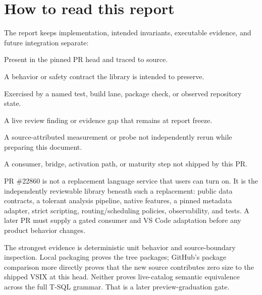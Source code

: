 \documentclass[11pt]{article}
\newcommand{\impl}{\textcolor{greenish}{\textbf{Implemented}}}
\newcommand{\valid}{\textcolor{teal}{\textbf{Validated}}}
\newcommand{\future}{\textcolor{amber}{\textbf{Future contract}}}
\newcommand{\target}{\textcolor{violetdark}{\textbf{Target invariant}}}
\newcommand{\gap}{\textcolor{redish}{\textbf{Open finding}}}
\newcommand{\reported}{\textcolor{slate}{\textbf{Reported evidence}}}
\begin{document}
\hypersetup{pageanchor=true}
\setcounter{tocdepth}{1}
\tableofcontents
\clearpage
{}

\section*{How to read this report}

The report keeps implementation, intended invariants, executable evidence, and future integration separate:

\begin{description}[leftmargin=2.15cm,style=nextline]
  \item[\impl] Present in the pinned PR head and traced to source.
  \item[\target] A behavior or safety contract the library is intended to preserve.
  \item[\valid] Exercised by a named test, build lane, package check, or observed repository state.
  \item[\gap] A live review finding or evidence gap that remains at report freeze.
  \item[\reported] A source-attributed measurement or probe not independently rerun while preparing this document.
  \item[\future] A consumer, bridge, activation path, or maturity step not shipped by this PR.
\end{description}

\begin{takeawaybox}
PR \#22860 is not a replacement language service that users can turn on. It is the independently reviewable library beneath such a replacement: public data contracts, a tolerant analysis pipeline, native features, a pinned metadata adapter, strict scripting, routing/scheduling policies, observability, and tests. A later PR must supply a gated consumer and VS Code adaptation before any product behavior changes.
\end{takeawaybox}

\begin{evidencebox}
The strongest evidence is deterministic unit behavior and source-boundary inspection. Local packaging proves the tree packages; GitHub's package comparison more directly proves that the new source contributes zero size to the shipped VSIX at this head. Neither proves live-catalog semantic equivalence across the full T-SQL grammar. That is a later preview-graduation gate.
\end{evidencebox}
\end{document}
